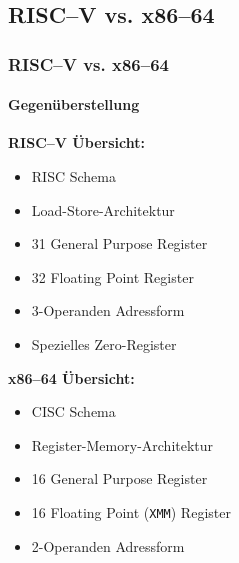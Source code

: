 \subsection{RISC--V vs. x86--64} %
\begin{frame}
    \frametitle{RISC--V vs. x86--64}
    \framesubtitle{Gegenüberstellung}

    \begin{minipage}[t]{.47\textwidth}
        \textbf{RISC--V Übersicht:}

        \begin{itemize}
            \item RISC Schema
            \item Load-Store-Architektur
            \item 31 General Purpose Register
            \item 32 Floating Point Register
            \item 3-Operanden Adressform
            \item Spezielles Zero-Register
        \end{itemize}
    \end{minipage}
    \begin{minipage}[t]{.47\textwidth}
        \textbf{x86--64 Übersicht:}

        \begin{itemize}
            \item CISC Schema
            \item Register-Memory-Architektur
            \item 16 General Purpose Register
            \item 16 Floating Point (\texttt{XMM}) Register
            \item 2-Operanden Adressform
        \end{itemize}
    \end{minipage}
\end{frame}

